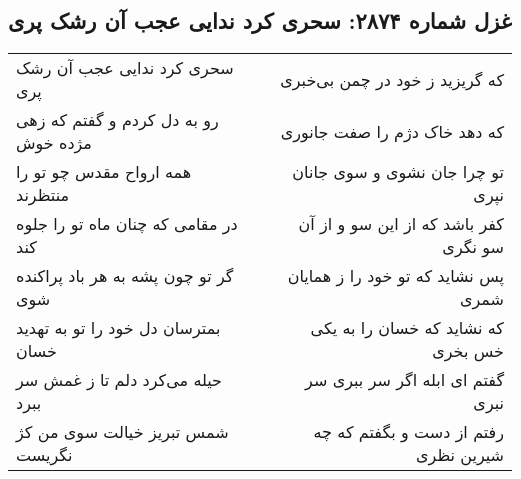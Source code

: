 \begin{center}
\section*{غزل شماره ۲۸۷۴: سحری کرد ندایی عجب آن رشک پری}
\label{sec:2874}
\begin{longtable}{l p{0.5cm} r}
سحری کرد ندایی عجب آن رشک پری
&&
که گریزید ز خود در چمن بی‌خبری
\\
رو به دل کردم و گفتم که زهی مژده خوش
&&
که دهد خاک دژم را صفت جانوری
\\
همه ارواح مقدس چو تو را منتظرند
&&
تو چرا جان نشوی و سوی جانان نپری
\\
در مقامی که چنان ماه تو را جلوه کند
&&
کفر باشد که از این سو و از آن سو نگری
\\
گر تو چون پشه به هر باد پراکنده شوی
&&
پس نشاید که تو خود را ز همایان شمری
\\
بمترسان دل خود را تو به تهدید خسان
&&
که نشاید که خسان را به یکی خس بخری
\\
حیله می‌کرد دلم تا ز غمش سر ببرد
&&
گفتم ای ابله اگر سر ببری سر نبری
\\
شمس تبریز خیالت سوی من کژ نگریست
&&
رفتم از دست و بگفتم که چه شیرین نظری
\\
\end{longtable}
\end{center}
